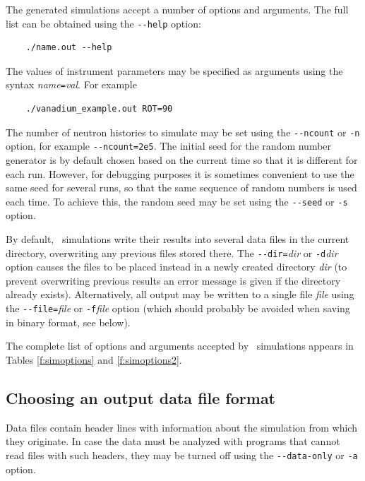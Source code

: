 The generated simulations accept a number of options and arguments. The
full list can be obtained using the \verb+--help+ option:
\begin{verbatim}
    ./name.out --help
\end{verbatim}
The values of instrument parameters may be specified as arguments using
the syntax \textit{name}\verb+=+\textit{val}. For example
\begin{verbatim}
    ./vanadium_example.out ROT=90
\end{verbatim}
The number of neutron histories to simulate may be set using the
\verb+--ncount+ or \verb+-n+ option, for example
\verb+--ncount=2e5+. The initial seed for the random number generator is
by default chosen based on the current time so that it is different for
each run. However, for debugging purposes it is sometimes convenient to
use the same seed for several runs, so that the same sequence of random
numbers is used each time. To achieve this, the random seed may be set
using the \verb+--seed+ or \verb+-s+ option.

By default, \MCS\ simulations write their results into several data files in the
current directory, overwriting any previous files stored there. The
\verb+--dir=+\textit{dir} or \verb+-d+\textit{dir} option causes the files to be
placed instead in a newly created directory \textit{dir} (to prevent overwriting
previous results an error message is given if the directory already exists).
Alternatively, all output may be written to a single file \textit{file} using
the \verb+--file=+\textit{file} or \verb+-f+\textit{file} option (which should
probably be avoided when saving in binary format, see below).

The complete list of options
and arguments accepted by \MCS\ simulations appears in
Tables \ref{f:simoptions} and \ref{f:simoptions2}.

\subsection{Choosing an output data file format}

Data files contain header lines with information about the
simulation from which they originate. In case the data must be analyzed
with programs that cannot read files with such headers, they may be
turned off using the \verb+--data-only+ or \verb+-a+ option.

